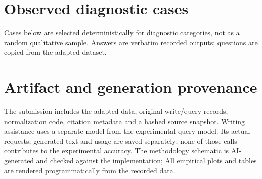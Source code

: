 \clearpage\section{Observed diagnostic cases}

Cases below are selected deterministically for diagnostic categories, not as a random qualitative sample. Answers are verbatim recorded outputs; questions are copied from the adapted dataset.

\section{Artifact and generation provenance}

The submission includes the adapted data, original write/query records, normalization code, citation metadata and a hashed source snapshot. Writing assistance uses a separate model from the experimental query model. Its actual requests, generated text and usage are saved separately; none of those calls contributes to the experimental accuracy. The methodology schematic is AI-generated and checked against the implementation; All empirical plots and tables are rendered programmatically from the recorded data.

